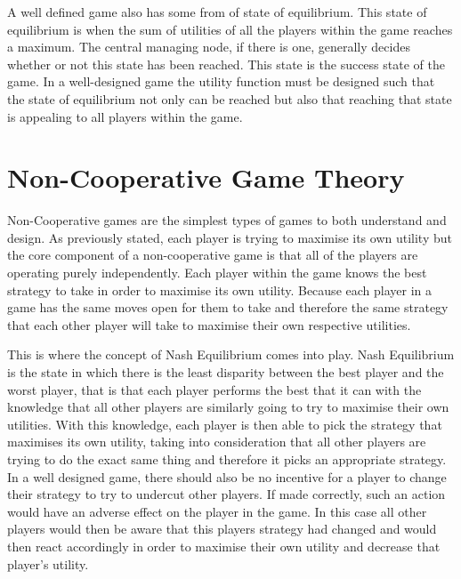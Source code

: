 \documentclass[a4paper, notitlepage]{report}
\begin{document}
A well defined game also has some from of state of equilibrium. This state of
equilibrium is when the sum of utilities of all the players within the game
reaches a maximum. The central managing node, if there is one, generally decides
whether or not this state has been reached. This state is the success state of
the game. In a well-designed game the utility function must be designed such
that the state of equilibrium not only can be reached but also that reaching
that state is appealing to all players within the game.
\section{Non-Cooperative Game Theory}
\label{sec:orgdd07552}
Non-Cooperative games are the simplest types of games to both understand and
design. As previously stated, each player is trying to maximise its own utility
but the core component of a non-cooperative game is that all of the players are
operating purely independently. Each player within the game knows the best
strategy to take in order to maximise its own utility. Because each player in a
game has the same moves open for them to take and therefore the same strategy
that each other player will take to maximise their own respective utilities.

This is where the concept of Nash Equilibrium comes into play. Nash Equilibrium
is the state in which there is the least disparity between the best player and
the worst player, that is that each player performs the best that it can with
the knowledge that all other players are similarly going to try to maximise
their own utilities. With this knowledge, each player is then able to pick the
strategy that maximises its own utility, taking into consideration that all
other players are trying to do the exact same thing and therefore it picks an
appropriate strategy. In a well designed game, there should also be no incentive
for a player to change their strategy to try to undercut other players. If made
correctly, such an action would have an adverse effect on the player in the
game. In this case all other players would then be aware that this players
strategy had changed and would then react accordingly in order to maximise their
own utility and decrease that player's utility.
\end{document}
